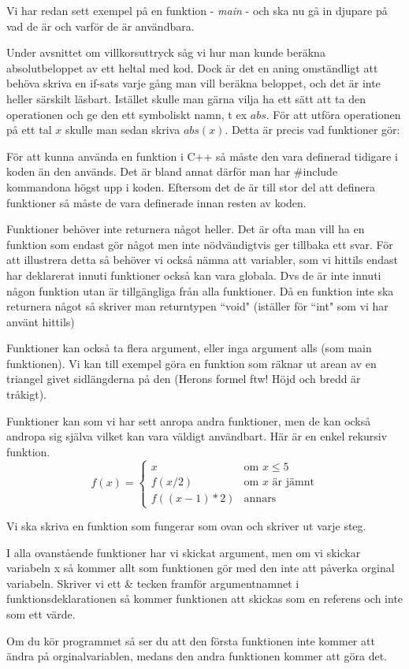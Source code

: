 Vi har redan sett exempel på en funktion - \emph{main} - och ska nu gå in djupare på vad de är och varför de är användbara.

Under avsnittet om villkorsuttryck såg vi hur man kunde beräkna absolutbeloppet av ett heltal med kod. Dock är det en aning omständligt att behöva skriva en if-sats varje gång man vill beräkna beloppet, och det är inte heller särskilt läsbart. Istället skulle man gärna vilja ha ett sätt att ta den operationen och ge den ett symboliskt namn, t ex $abs$. För att utföra operationen på ett tal $x$ skulle man sedan skriva $abs(x)$. Detta är precis vad funktioner gör:




För att kunna använda en funktion i C++ så måste den vara definerad tidigare i koden än den används. Det är bland annat därför man har \#include kommandona högst upp i koden. Eftersom det de är till stor del att definera funktioner så måste de vara definerade innan resten av koden.

Funktioner behöver inte returnera något heller. Det är ofta man vill ha en funktion som endast gör något men inte nödvändigtvis ger tillbaka ett svar. För att illustrera detta så behöver vi också nämna att variabler, som vi hittils endast har deklarerat innuti funktioner också kan vara globala. Dvs de är inte innuti någon funktion utan är tillgängliga från alla funktioner. Då en funktion inte ska returnera något så skriver man returntypen ``void" (iställer för ``int" som vi har använt hittils)



Funktioner kan också ta flera argument, eller inga argument alls (som main funktionen). Vi kan till exempel göra en funktion som räknar ut arean av en triangel givet sidlängderna på den (Herons formel ftw! Höjd och bredd är tråkigt).



Funktioner kan som vi har sett anropa andra funktioner, men de kan också andropa sig själva vilket kan vara väldigt användbart.
Här är en enkel rekursiv funktion.
$$
f(x) = 
\left\{
    \begin{array}{ll}
        x & \mbox{om } x \leq 5 \\
        f (x/2) & \mbox{om } x \mbox{ är jämnt} \\
        f ((x-1)*2) & \mbox{annars}
    \end{array}
\right.
$$

Vi ska skriva en funktion som fungerar som ovan och skriver ut varje steg.



I alla ovanstående funktioner har vi skickat argument, men om vi skickar variabeln x så kommer allt som funktionen gör med den inte att påverka orginal variabeln.
Skriver vi ett \& tecken framför argumentnamnet i funktionsdeklarationen så kommer funktionen att skickas som en referens och inte som ett värde.



Om du kör programmet så ser du att den första funktionen inte kommer att ändra på orginalvariablen, medans den andra funktionen kommer att göra det.